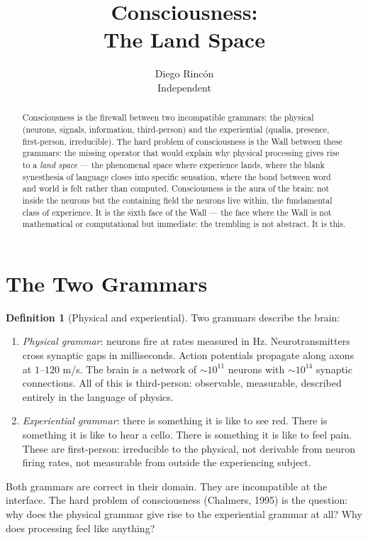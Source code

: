 \documentclass[12pt]{article}
\title{Consciousness:\\
The Land Space}
\author{Diego Rinc\'on\\
\small Independent}
\date{}
\theoremstyle{definition}
\newtheorem{definition}[theorem]{Definition}
\theoremstyle{remark}
\begin{document}
\maketitle

\begin{abstract}
Consciousness is the firewall \cite{firewall} between two incompatible grammars:
the physical (neurons, signals, information, third-person)
and the experiential (qualia, presence, first-person, irreducible).
The hard problem of consciousness is the Wall \cite{synthesis}
between these grammars: the missing operator
that would explain why physical processing
gives rise to a \emph{land space} ---
the phenomenal space where experience lands,
where the blank synesthesia \cite{chimera} of language
closes into specific sensation,
where the bond between word and world is felt rather than computed.
Consciousness is the aura \cite{five} of the brain:
not inside the neurons but the containing field the neurons live within,
the fundamental class \cite{contained} of experience.
It is the sixth face of the Wall ---
the face where the Wall is not mathematical or computational
but immediate: the trembling is not abstract.
It is this.
\end{abstract}

\section{The Two Grammars}

\begin{definition}[Physical and experiential]
Two grammars describe the brain:
\begin{enumerate}
\item \emph{Physical grammar}:
  neurons fire at rates measured in Hz.
  Neurotransmitters cross synaptic gaps in milliseconds.
  Action potentials propagate along axons at $1$--$120$ m/s.
  The brain is a network of $\sim 10^{11}$ neurons
  with $\sim 10^{14}$ synaptic connections.
  All of this is third-person: observable, measurable,
  described entirely in the language of physics.

\item \emph{Experiential grammar}:
  there is something it is like to see red.
  There is something it is like to hear a cello.
  There is something it is like to feel pain.
  These are first-person: irreducible to the physical,
  not derivable from neuron firing rates,
  not measurable from outside the experiencing subject.
\end{enumerate}
Both grammars are correct in their domain.
They are incompatible at the interface.
The hard problem of consciousness (Chalmers, 1995)
is the question: why does the physical grammar
give rise to the experiential grammar at all?
Why does processing feel like anything?
\end{definition}
\end{document}
